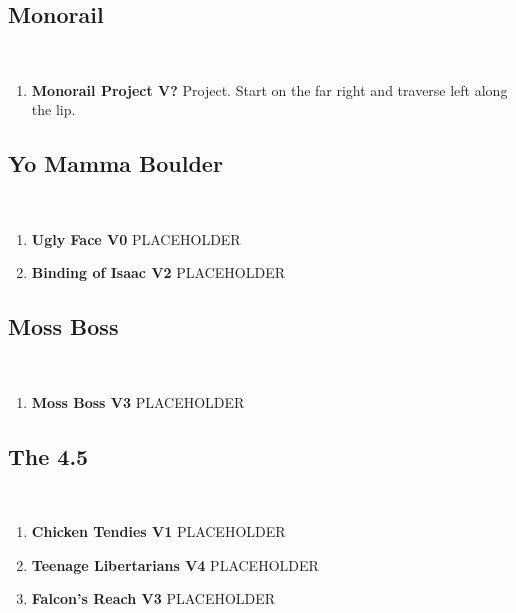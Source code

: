 \subsection*{Monorail}\label{bf:Monorail}
\

\begin{enumerate}[resume]
	\item\label{rt:Monorail Project} \colorbox{black!20}{\textbf{Monorail Project V?  } }
	\newline Project. Start on the far right and traverse left along the lip.\
\end{enumerate}
\subsection*{Yo Mamma Boulder}\label{bf:Yo Mamma Boulder}
\

\begin{enumerate}[resume]
	\item\label{rt:Ugly Face} \colorbox{green!20}{\textbf{Ugly Face V0   \warn } }
	\newline PLACEHOLDER\
	\item\label{rt:Binding of Isaac} \colorbox{green!20}{\textbf{Binding of Isaac V2     \warn } }
	\newline PLACEHOLDER\
\end{enumerate}
\subsection*{Moss Boss}\label{bf:Moss Boss}
\

\begin{enumerate}[resume]
	\item\label{rt:Moss Boss} \colorbox{green!20}{\textbf{Moss Boss V3    } }
	\newline PLACEHOLDER\
\end{enumerate}
\subsection*{The 4.5}\label{bf:The 4.5}
\

\begin{enumerate}[resume]
	\item\label{rt:Chicken Tendies} \colorbox{green!20}{\textbf{Chicken Tendies V1   } }
	\newline PLACEHOLDER\
	\item\label{rt:Teenage Libertarians} \colorbox{RoyalBlue!20}{\textbf{Teenage Libertarians V4      } }
	\newline PLACEHOLDER\
	\item\label{rt:Falcon's Reach} \colorbox{green!20}{\textbf{Falcon's Reach V3    } }
	\newline PLACEHOLDER\
\end{enumerate}
